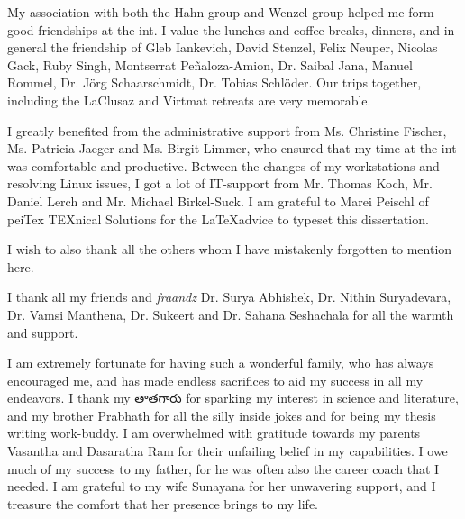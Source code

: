 My association with both the Hahn group and Wenzel group helped me form good friendships at the \gls{int}. I value the lunches and coffee breaks, dinners, and in general the friendship of Gleb Iankevich, David Stenzel, Felix Neuper, Nicolas Gack, Ruby Singh, Montserrat Pe\~naloza-Amion, Dr. Saibal Jana, Manuel Rommel, Dr. J\"org Schaarschmidt, Dr. Tobias Schl\"oder. Our trips together, including the LaClusaz and Virtmat retreats are very memorable. \par

I greatly benefited from the administrative support from Ms. Christine Fischer, Ms. Patricia Jaeger and Ms. Birgit Limmer, who ensured that my time at the \gls{int} was comfortable and productive. Between the changes of my workstations and resolving Linux issues, I got a lot of IT-support from Mr. Thomas Koch, Mr. Daniel Lerch and Mr. Michael Birkel-Suck. I am grateful to Marei Peischl of peiTex TEXnical Solutions for the \LaTeX advice to typeset this dissertation. \par

I wish to also thank all the others whom I have mistakenly forgotten to mention here. \par

I thank all my friends and \textit{fraandz} Dr. Surya Abhishek, Dr. Nithin Suryadevara, Dr. Vamsi Manthena, Dr. Sukeert and Dr. Sahana Seshachala for all the warmth and support. \par 

I am extremely fortunate for having such a wonderful family, who has always encouraged me, and has made endless sacrifices to aid my success in all my endeavors. I thank my {\tel తాతగారు} for sparking my interest in science and literature, and my brother Prabhath for all the silly inside jokes and for being my thesis writing work-buddy. I am overwhelmed with gratitude towards my parents Vasantha and Dasaratha Ram for their unfailing belief in my capabilities. I owe much of my success to my father, for he was often also the career coach that I needed. I am grateful to my wife Sunayana for her unwavering support, and I treasure the comfort that her presence brings to my life.

\clearpage